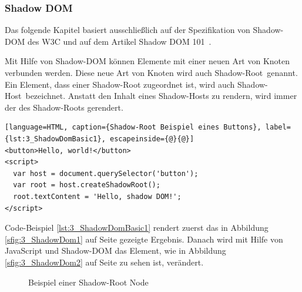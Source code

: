 \subsubsection{Shadow DOM}
\label{sec:3_WC_Shadow_DOM}

Das folgende Kapitel basiert ausschließlich auf der Spezifikation von Shadow-DOM des W3C \citereset \autocite[siehe][]{GlazkovShadowDOM.2013} und auf dem Artikel \glqq Shadow DOM 101\grqq\ \citereset \autocite[siehe][]{Cooney.2013}.

Mit Hilfe von Shadow-DOM können Elemente mit einer neuen Art von Knoten verbunden werden. Diese neue Art von Knoten wird auch \glqq Shadow-Root\grqq\ genannt. Ein Element, dass einer Shadow-Root zugeordnet ist, wird auch \glqq Shadow-Host\grqq\ bezeichnet. Anstatt den Inhalt eines Shadow-Hosts zu rendern, wird immer der des Shadow-Roots gerendert.

\begin{lstlisting}[language=HTML, caption={Shadow-Root Beispiel eines Buttons}, label={lst:3_ShadowDomBasic1}, escapeinside={@}{@}]
<button>Hello, world!</button>
<script>
  var host = document.querySelector('button');
  var root = host.createShadowRoot();
  root.textContent = 'Hello, shadow DOM!';
</script>
\end{lstlisting}

Code-Beispiel \ref{lst:3_ShadowDomBasic1} rendert zuerst das in Abbildung \ref{sfig:3_ShadowDom1} auf Seite \pageref{sfig:3_ShadowDom1} gezeigte Ergebnis. Danach wird mit Hilfe von JavaScript und Shadow-DOM das Element, wie in Abbildung \ref{sfig:3_ShadowDom2} auf Seite \pageref{sfig:3_ShadowDom2} zu sehen ist, verändert.

\begin{figure}[h]
  \centering
  \qquad
  \caption[
    Beispiel einer Shadow-Root Node
  ]{
    Beispiel einer Shadow-Root Node
  }
  \label{sfig:3_ShadowDom}
\end{figure}

